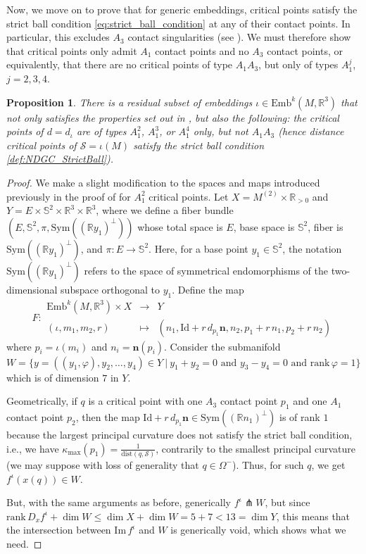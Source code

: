 \documentclass[11pt]{article}
\newcommand{\R}{\mathbb{R}}
\newcommand{\io}{\iota}
\newcommand{\nbf}{\mathbf{n}}
\newcommand{\W}{\Omega}
\newcommand{\kap}{\kappa}
\newcommand{\Emb}{\mathrm{Emb}^k(M,\R^3)}
\newcommand{\dist}{\mathrm{dist}}
\newcommand{\Surf}{\mathcal{S}}
\newcommand{\Id}{\mathrm{Id}}
\renewcommand{\Im}{\mathrm{Im} \,}
\newcommand{\rank}{\mathrm{rank} \,}
\theoremstyle{plain}
\newtheorem{prop}{Proposition}
\theoremstyle{definition}
\theoremstyle{remark}
\begin{document}
Now, we move on to prove that for generic embeddings, critical points satisfy the strict ball condition \eqref{eq:strict_ball_condition} at any of their contact points. In particular, this excludes $A_3$ contact singularities (see \cite{cazals_differential_2005}). We must therefore show that critical points only admit $A_1$ contact points and no $A_3$ contact points, or equivalently, that there are no critical points of type $A_1 A_3$, but only of types $A_1^j$, $j = 2,3,4$.

\begin{prop}
	\label{prop:no_A_1_A_3}
There is a residual subset of embeddings $\iota \in \Emb$ that not only satisfies the properties set out in , but also the following: the critical points of $d = d_\iota$ are of types $A_1^2$, $A_1^3$, or $A_1^4$ only, \emph{but not} $A_1 A_3$ (hence distance critical points of $\Surf = \iota(M)$ satisfy the strict ball condition \ref{def:NDGC_StrictBall}). 
\end{prop}

\begin{proof}
We make a slight modification to the spaces and maps introduced previously in the proof of  for $A_1^2$ critical points. Let $X = M^{(2)} \times \R_{>0}$ and $Y = E \times \mathbb{S}^2 \times \R^3 \times \R^3$, where we define a fiber bundle $(E, \mathbb{S}^2, \pi, \mathrm{Sym}((\R y_1)^\perp))$ whose total space is $E$, base space is $\mathbb{S}^2$, fiber is $\mathrm{Sym}((\R y_1)^\perp)$, and $\pi : E \to \mathbb{S}^2$. Here, for a base point $y_1 \in \mathbb{S}^2$, the notation $\mathrm{Sym}((\R y_1)^\perp)$ refers to the space of symmetrical endomorphisms of the two-dimensional subspace orthogonal to $y_1$. 
Define the map
\begin{equation}
	F:
	\begin{array}{ccc}
		\Emb \times X & \to & Y \\
		(\io, m_1,m_2,r) & \mapsto & (n_1, \Id + r \, d_{p_1}\nbf, n_2, p_1 + r \, n_1, p_2 + r \, n_2 )
	\end{array}
\end{equation}
where $p_i = \io(m_i)$ and $n_i = \nbf(p_i)$. Consider the submanifold $W = \{y = ( (y_1, \varphi), y_2, \ldots, y_4)\in Y ~|~ y_1 + y_2 = 0 \text{ and } y_3 - y_4 = 0 \text{ and } \rank \varphi = 1\}$ which is of dimension $7$ in $Y$.

Geometrically, if $q$ is a critical point with one $A_3$ contact point $p_1$ and one $A_1$ contact point $p_2$, then the map $\Id + r \, d_{p_1}\nbf \in \mathrm{Sym}((\R n_1)^\perp)$ is of rank $1$ because the largest principal curvature does not satisfy the strict ball condition, i.e., we have $\kap_{\text{max}}(p_1) = \frac{1}{\dist(q,\Surf)}$, contrarily to the smallest principal curvature (we may suppose with loss of generality that $q \in \W^-$). Thus, for such $q$, we get $f^\io(x(q)) \in W$.

But, with the same arguments as before, generically $f^\io \pitchfork W$, but since $\rank D_x f^\io + \dim W \leq \dim X + \dim W = 5 + 7 < 13 = \dim Y$, this means that the intersection between $\Im f^\io$ and $W$ is generically void, which shows what we need.
\end{proof}
\end{document}
